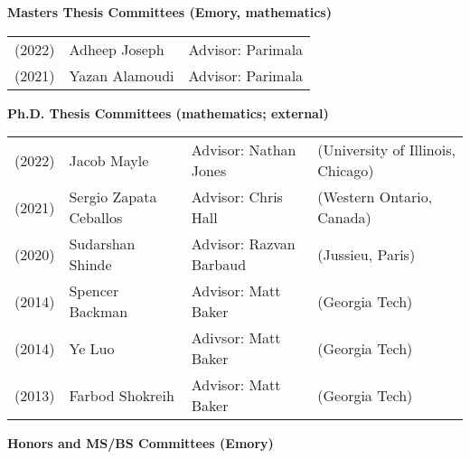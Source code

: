 \documentclass[margin,line]{res}
\begin{document}
\begin{resume}
{\bf Masters Thesis Committees (Emory, mathematics)}
\vspace*{-.15in}

\begin{tabular}{lll}
  (2022) & Adheep Joseph & Advisor: Parimala\\
  (2021) & Yazan Alamoudi & Advisor: Parimala\\    
\end{tabular}

{\bf Ph.D. Thesis Committees (mathematics; external)}
\vspace*{-.15in}

\begin{tabular}{llll}
(2022) & Jacob Mayle & Advisor:  Nathan Jones & (University of Illinois, Chicago)\\    
(2021) & Sergio Zapata Ceballos & Advisor:  Chris Hall & (Western Ontario, Canada)\\  
(2020) & Sudarshan Shinde & Advisor:  Razvan Barbaud & (Jussieu, Paris)\\
(2014) & Spencer Backman & Advisor: Matt Baker & (Georgia Tech)\\
(2014) & Ye Luo & Adivsor: Matt Baker & (Georgia Tech)\\
(2013) & Farbod Shokreih &  Advisor: Matt Baker & (Georgia Tech)\\
\end{tabular}

{\bf Honors and MS/BS Committees (Emory)}
\vspace*{-.15in}


\end{resume}
\end{document}
